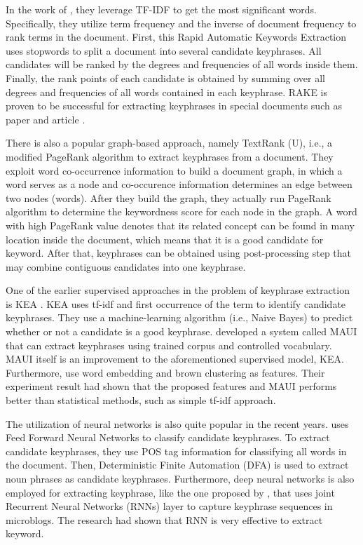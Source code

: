 In the work of \cite{sparck1972statistical}, they leverage TF-IDF to get the most significant words. Specifically, they utilize term frequency and the inverse of document frequency to rank terms in the document. First, this Rapid Automatic Keywords Extraction \cite{rake} uses stopwords to split a document into several candidate keyphrases. All candidates will be ranked by the degrees and frequencies of all words inside them. Finally, the rank points of each candidate is obtained by summing over all degrees and frequencies of all words contained in each keyphrase. RAKE is proven to be successful for extracting keyphrases in special documents such as paper and article \cite{rake}.

There is also a popular graph-based approach, namely TextRank (U), i.e., a modified PageRank algorithm to extract keyphrases from a document. They exploit word co-occurrence information to build a document graph, in which a word serves as a node and co-occurence information determines an edge between two nodes (words). After they build the graph, they actually run PageRank algorithm to determine the keywordness score for each node in the graph. A word with high PageRank value denotes that its related concept can be found in many location inside the document, which means that it is a good candidate for keyword. After that, keyphrases can be obtained using post-processing step that may combine contiguous candidates into one keyphrase.

One of the earlier supervised approaches in the problem of keyphrase extraction is KEA \cite{witten1999kea}. KEA uses tf-idf and first occurrence of the term to identify candidate keyphrases. They use a machine-learning algorithm (i.e., Naive Bayes) to predict whether or not a candidate is a good keyphrase. \cite{medelyan2009human} developed a system called MAUI that can extract keyphrases using trained corpus and controlled vocabulary. MAUI itself is an improvement to the aforementioned supervised model, KEA. Furthermore, \cite{marujoMAUI} use word embedding and brown clustering as features. Their experiment result had shown that the proposed features and MAUI performs better than statistical methods, such as simple tf-idf approach.

The utilization of neural networks is also quite popular in the recent years. \cite{ekpNeuralNetworks} uses Feed Forward Neural Networks to classify candidate keyphrases. To extract candidate keyphrases, they use POS tag information for classifying all words in the document. Then, Deterministic Finite Automation (DFA) is used to extract noun phrases as candidate keyphrases. Furthermore, deep neural networks is also employed for extracting keyphrase, like the one proposed by \cite{zhang2016keyphrase}, that uses joint Recurrent Neural Networks (RNNs) layer to capture keyphrase sequences in microblogs. The research had shown that RNN is very effective to extract keyword.

